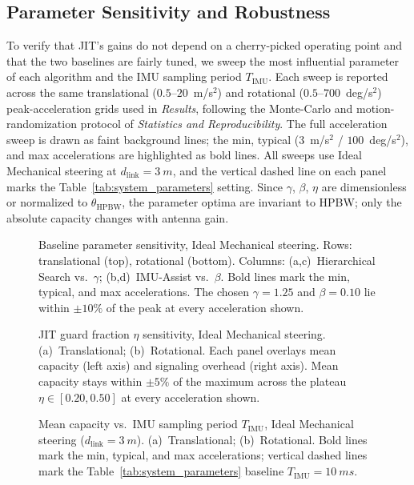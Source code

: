 \documentclass[fleqn,10pt]{wlscirep}
\newcommand{\rev}[1]{#1}
\begin{document}
\rev{
\subsection*{Parameter Sensitivity and Robustness}
To verify that JIT's gains do not depend on a cherry-picked operating point and that the two baselines are fairly tuned, we sweep the most influential parameter of each algorithm and the IMU sampling period $T_{\text{IMU}}$. Each sweep is reported across the same translational ($0.5$--$20$~m/s$^2$) and rotational ($0.5$--$700$~deg/s$^2$) peak-acceleration grids used in \emph{Results}, following the Monte-Carlo and motion-randomization protocol of \emph{Statistics and Reproducibility}. The full acceleration sweep is drawn as faint background lines; the min, typical ($3$~m/s$^2$ / $100$~deg/s$^2$), and max accelerations are highlighted as bold lines. All sweeps use Ideal Mechanical steering at $d_{\text{link}} = \SI{3}{m}$, and the vertical dashed line on each panel marks the Table~\ref{tab:system_parameters} setting. Since $\gamma$, $\beta$, $\eta$ are dimensionless or normalized to $\theta_{\text{HPBW}}$, the parameter optima are invariant to HPBW; only the absolute capacity changes with antenna gain.

\begin{figure}[h!]
\centering

\caption{Baseline parameter sensitivity, Ideal Mechanical steering. Rows: translational (top), rotational (bottom). Columns: (a,c)~Hierarchical Search vs.\ $\gamma$; (b,d)~IMU-Assist vs.\ $\beta$. Bold lines mark the min, typical, and max accelerations. The chosen $\gamma = 1.25$ and $\beta = 0.10$ lie within $\pm 10\%$ of the peak at every acceleration shown.}
\label{fig:tuning_hsimu}
\end{figure}

\begin{figure}[h!]
\centering

\caption{JIT guard fraction $\eta$ sensitivity, Ideal Mechanical steering. (a)~Translational; (b)~Rotational. Each panel overlays mean capacity (left axis) and signaling overhead (right axis). Mean capacity stays within $\pm 5\%$ of the maximum across the plateau $\eta \in [0.20, 0.50]$ at every acceleration shown.}
\label{fig:tuning_jiteta}
\end{figure}

\begin{figure}[h!]
\centering

\caption{Mean capacity vs.\ IMU sampling period $T_{\text{IMU}}$, Ideal Mechanical steering ($d_{\text{link}}=\SI{3}{m}$). (a)~Translational; (b)~Rotational. Bold lines mark the min, typical, and max accelerations; vertical dashed lines mark the Table~\ref{tab:system_parameters} baseline $T_{\text{IMU}} = \SI{10}{ms}$.}
\label{fig:tuning_timescales}
\end{figure}

}
\end{document}
